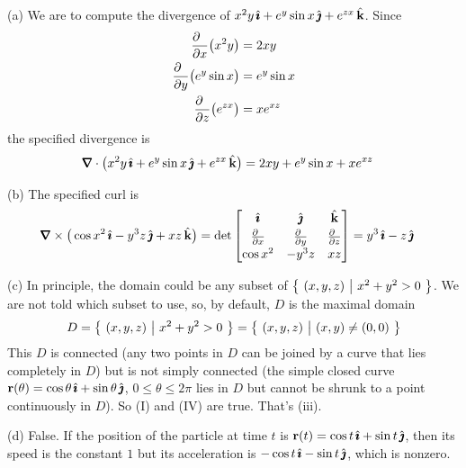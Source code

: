 \begin{solution} 
(a) We are to compute the divergence of 
$x^2 y\,\hat{\pmb{\imath}} + e^y \sin x\,\hat{\pmb{\jmath}} + e^{zx}\,\hat{\mathbf{k}}$. Since
\begin{alignat*}{3}
\frac{\partial\hfill}{\partial x}\big(x^2 y\big)
&=2xy
\\
\frac{\partial\hfill}{\partial y}\big(e^y \sin x\big)
&= e^y\sin x
\\
\frac{\partial\hfill}{\partial z}\big(e^{zx}\big)
&=xe^{xz}
\end{alignat*}
the specified divergence is
\begin{align*}
\vnabla\cdot\big(x^2 y\,\hi + e^y \sin x\,\hj + e^{zx}\,\hk\big) 
        &= 2xy + e^y\sin x + xe^{xz}
\end{align*}

(b) The specified curl is
\begin{align*}
\vnabla\times\big(\cos x^2\,\hi - y^3 z\,\hj + xz\,\hk\big)
&=\det\left[\begin{matrix}\hi&\hj&\hk\\[0.03in] 
     \frac{\partial\hfill}{\partial x}&
        \frac{\partial\hfill}{\partial y}&
        \frac{\partial\hfill}{\partial z}\\[0.03in]
\cos x^2 & - y^3 z & xz\end{matrix}\right]
= y^3\,\hi-z\,\hj
\end{align*}

(c) In principle, the domain could be any subset of $\big\{ \ (x,y,z)\ \big|\ x^2+y^2>0\ \big\}$.
We are not told which subset to use, so, by default, $D$ is the maximal
domain
\begin{equation*}
D=\big\{ \ (x,y,z)\ \big|\ x^2+y^2>0\ \big\} = \big\{ \ (x,y,z)\ \big|\ (x,y)\ne (0,0)\ \big\}
\end{equation*} 
This $D$ is connected (any two points in $D$
can be joined by a curve that lies completely in $D$) but is not
simply connected (the simple closed curve $\mathbf{r}(\theta)=\cos\theta\,\hat{\pmb{\imath}}
+\sin\theta\,\hat{\pmb{\jmath}}$, $0\le\theta\le 2\pi$ lies in $D$ but cannot be shrunk 
to a point continuously in $D$). So (I) and (IV) are true. That's (iii).

(d) False. If the position of the particle at time $t$ is
$\mathbf{r}(t) = \cos t\,\hat{\pmb{\imath}} +\sin t\,\hat{\pmb{\jmath}}$, then its speed is the constant $1$ 
but its acceleration is $-\cos t\,\hat{\pmb{\imath}} -\sin t\,\hat{\pmb{\jmath}}$, which is nonzero.
\end{solution}


